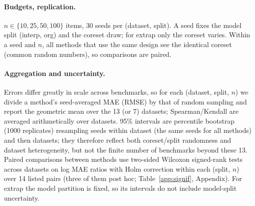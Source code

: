 \paragraph{Budgets, replication.}
$n\in\{10,25,50,100\}$ items, 30 seeds per (dataset, split).  A seed fixes the model split (interp, org) and the coreset draw; for extrap only the coreset varies.
Within a seed and $n$, all methods that use the same design see the identical coreset (common random numbers), so comparisons are paired.

\paragraph{Aggregation and uncertainty.}
Errors differ greatly in scale across benchmarks, so for each (dataset, split, $n$) we divide a method's seed-averaged MAE (RMSE) by that of random sampling and report the geometric mean over the 13 (or 7) datasets; Spearman/Kendall are averaged arithmetically over datasets.
95\% intervals are percentile bootstrap (1000 replicates) resampling seeds within dataset (the same seeds for all methods) and then datasets; they therefore reflect both coreset/split randomness and dataset heterogeneity, but not the finite number of benchmarks beyond these 13.
Paired comparisons between methods use two-sided Wilcoxon signed-rank tests across datasets on log MAE ratios with Holm correction within each (split, $n$) over 14 listed pairs (three of them post hoc; Table~\ref{app:signif}, Appendix).
For extrap the model partition is fixed, so its intervals do not include model-split uncertainty.
